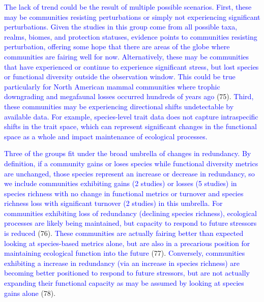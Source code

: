 \documentclass{article}
\begin{document}
\textcolor{blue}{The lack of trend could be the result of multiple possible scenarios. First, these may be communities resisting perturbations or simply not experiencing significant perturbations. Given the studies in this group come from all possible taxa, realms, biomes, and protection statuses, evidence points to communities resisting perturbation, offering some hope that there are areas of the globe where communities are fairing well for now. Alternatively, these may be communities that have experienced or continue to experience significant stress, but lost species or functional diversity outside the observation window. This could be true particularly for North American mammal communities where trophic downgrading and megafaunal losses occurred hundreds of years ago }(75).
\textcolor{blue}{Third, these communities may be experiencing directional shifts undetectable by available data. For example, species-level trait data does not capture intraspecific shifts in the trait space, which can represent significant changes in the functional space as a whole and impact maintenance of ecological processes.}

\textcolor{blue}{Three of the groups fit under the broad umbrella of changes in redundancy. By definition, if a community gains or loses species while functional diversity metrics are unchanged, those species represent an increase or decrease in redundancy, so we include communities exhibiting gains (2 studies) or losses (5 studies) in species richness with no change in functional metrics or turnover and species richness loss with significant turnover (2 studies) in this umbrella. For communities exhibiting loss of redundancy (declining species richness), ecological processes are likely being maintained, but capacity to respond to future stressors is reduced }(76).
\textcolor{blue}{These communities are actually fairing better than expected looking at species-based metrics alone, but are also in a precarious position for maintaining ecological function into the future }(77).
\textcolor{blue}{Conversely, communities exhibiting a increase in redundancy (via an increase in species richness) are becoming better positioned to respond to future stressors, but are not actually expanding their functional capacity as may be assumed by looking at species gains alone}
(78).
\end{document}
